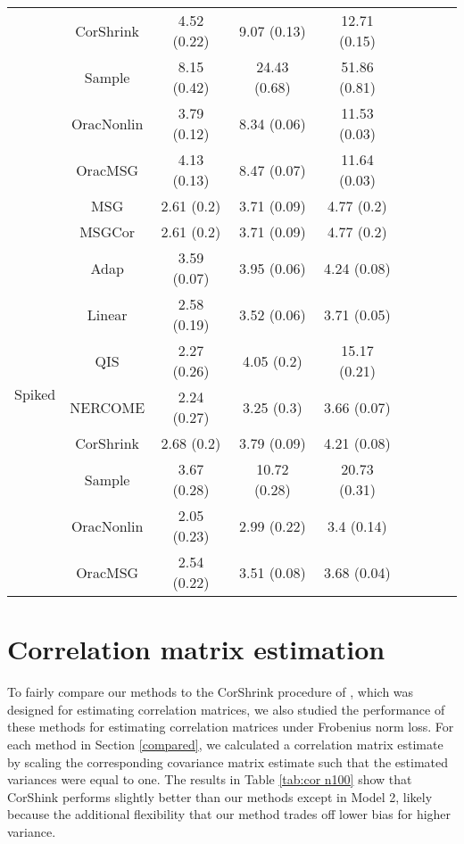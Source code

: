 \documentclass[useAMS,referee,usenatbib]{biom}
\begin{document}
\begin{table}[H]
{\begin{tabular}{ccccccccc}
 & CorShrink      & 4.52 (0.22) & 9.07 (0.13)  & 12.71 (0.15) \\
 & Sample            & 8.15 (0.42) & 24.43 (0.68) & 51.86 (0.81) \\
 & OracNonlin & 3.79 (0.12) & 8.34 (0.06)  & 11.53 (0.03) \\
 & OracMSG  & 4.13 (0.13) & 8.47 (0.07)  & 11.64 (0.03)  \\  \midrule
\multirow{10}{*}{Spiked}  
 & MSG & 2.61 (0.2)  & 3.71 (0.09)  & 4.77 (0.2)   \\
 & MSGCor   & 2.61 (0.2)  & 3.71 (0.09)  & 4.77 (0.2)   \\
 & Adap     & 3.59 (0.07) & 3.95 (0.06)  & 4.24 (0.08)  \\
 & Linear         & 2.58 (0.19) & 3.52 (0.06)  & 3.71 (0.05)  \\
 & QIS            & 2.27 (0.26) & 4.05 (0.2)   & 15.17 (0.21) \\
 & NERCOME        & 2.24 (0.27) & 3.25 (0.3)   & 3.66 (0.07)  \\
 & CorShrink      & 2.68 (0.2)  & 3.79 (0.09)  & 4.21 (0.08)  \\
 & Sample            & 3.67 (0.28) & 10.72 (0.28) & 20.73 (0.31) \\
 & OracNonlin & 2.05 (0.23) & 2.99 (0.22)  & 3.4 (0.14)   \\
 & OracMSG  & 2.54 (0.22) & 3.51 (0.08)  & 3.68 (0.04) \\ \bottomrule
\end{tabular}%
}
\end{table}

\section{Correlation matrix estimation}

To fairly compare our methods to the CorShrink procedure of \citet{dey2018corshrink}, which was designed for estimating correlation matrices, we also studied the performance of these methods for estimating correlation matrices under Frobenius norm loss. For each method in Section \ref{compared}, we calculated a correlation matrix estimate by scaling the corresponding covariance matrix estimate such that the estimated variances were equal to one. The results in Table \ref{tab:cor n100} show that CorShink performs slightly better than our methods except in Model 2, likely because the additional flexibility that our method trades off lower bias for higher variance.
\end{document}
